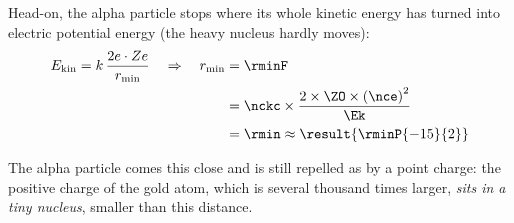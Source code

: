 \begin{abcliste}
\abc Head-on, the alpha particle stops where its whole kinetic energy has turned into electric potential energy (the heavy nucleus hardly moves):
\begin{align}
 E_\mathrm{kin} = k\,\frac{2e\cdot Z e}{r_\mathrm{min}} \quad\Rightarrow\quad r_\mathrm{min} &= \rminF \\
   &= \nckc\times\frac{2\times\ZO\times\left(\nce\right)^2}{\Ek} \\
   &= \rmin \approx \result{\rminP{-15}{2}}
\end{align}

\abc The alpha particle comes this close and is still repelled as by a point charge: the positive charge of the gold atom, which is several thousand times larger, \emph{sits in a tiny nucleus}, smaller than this distance.
\end{abcliste}
